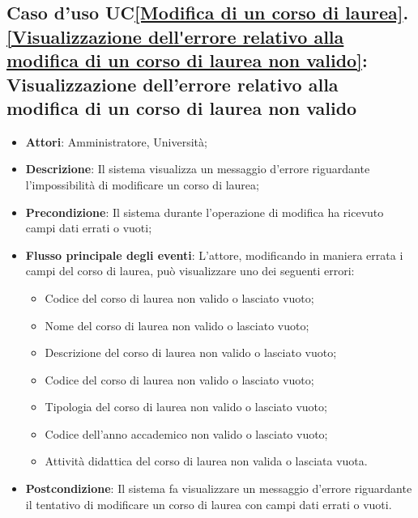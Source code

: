 \subsection{Caso d'uso UC\ref{Modifica di un corso di laurea}.\ref{Visualizzazione dell'errore relativo alla modifica di un corso di laurea non valido}: Visualizzazione dell'errore relativo alla modifica di un corso di laurea non valido}
\begin{itemize}
	\item \textbf{Attori}: Amministratore, Università;
	\item \textbf{Descrizione}: Il sistema visualizza un messaggio d'errore riguardante l'impossibilità di modificare un corso di laurea;
	
	\item \textbf{Precondizione}: Il sistema durante l'operazione di modifica ha ricevuto campi dati errati o vuoti;
	
	\item \textbf{Flusso principale degli eventi}: L'attore, modificando in maniera errata i campi del corso di laurea, può visualizzare uno dei seguenti errori: 
	\begin{itemize} 
		\item Codice del corso di laurea non valido o lasciato vuoto; 
		\item Nome del corso di laurea non valido o lasciato vuoto; 
		\item Descrizione del corso di laurea non valido o lasciato vuoto; 
		\item Codice del corso di laurea non valido o lasciato vuoto; 
		\item Tipologia del corso di laurea non valido o lasciato vuoto; 
		\item Codice dell'anno accademico non valido o lasciato vuoto; 
		\item Attività didattica del corso di laurea non valida o lasciata vuota.
	\end{itemize}
	\item \textbf{Postcondizione}: Il sistema fa visualizzare un messaggio d'errore riguardante il tentativo di modificare un corso di laurea con campi dati errati o vuoti.
	
\end{itemize}





